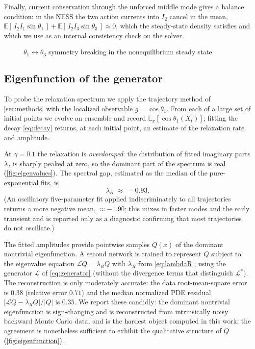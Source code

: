 \documentclass[11pt,a4paper]{article}
\theoremstyle{definition}
\newcommand{\E}{\mathbb{E}}
\numberwithin{equation}{section}   %
\newcommand{\Lgen}{\mathcal{L}}
\newcommand{\Ladj}{\mathcal{L}^{*}}
\begin{document}
Finally, current conservation through the unforced middle mode gives a balance
condition: in the NESS the two action currents into $I_2$ cancel in the mean,
$\E[\,I_2 I_1\sin\theta_1\,]+\E[\,I_2 I_3\sin\theta_3\,]\approx 0$, which the
steady-state density satisfies and which we use as an internal consistency check
on the solver.

\begin{figure}[ht]
  \centering
  \caption{$\theta_1\leftrightarrow\theta_3$ symmetry breaking in the
  nonequilibrium steady state.}
  \label{fig:symmetry}
\end{figure}

\subsection{Eigenfunction of the generator}\label{sec:eigenfunction}

To probe the relaxation spectrum we apply the trajectory method of
\cref{sec:methods} with the localized observable $g=\cos\theta_1$. From each of
a large set of initial points we evolve an ensemble and record
$\E_x[\cos\theta_1(X_t)]$; fitting the decay \eqref{eq:decay} returns, at each
initial point, an estimate of the relaxation rate and amplitude.

At $\gamma=0.1$ the relaxation is \emph{overdamped}: the distribution of fitted
imaginary parts $\lambda_I$ is sharply peaked at zero, so the dominant part of
the spectrum is real (\cref{fig:eigenvalues}). The spectral gap, estimated as
the median of the pure-exponential fits, is
\begin{equation}\label{eq:lambdaR}
  \lambda_R \;\approx\; -0.93 .
\end{equation}
(An oscillatory five-parameter fit applied indiscriminately to all trajectories
returns a more negative mean, $\approx-1.90$; this mixes in faster modes and the
early transient and is reported only as a diagnostic confirming that most
trajectories do not oscillate.)

The fitted amplitudes provide pointwise samples $Q(x)$ of the dominant
nontrivial eigenfunction. A second network is trained to represent $Q$ subject
to the eigenvalue equation $\Lgen Q=\lambda_R Q$ with $\lambda_R$ from
\eqref{eq:lambdaR}, using the generator $\Lgen$ of \eqref{eq:generator} (without
the divergence terms that distinguish $\Ladj$). The reconstruction is only
moderately accurate: the data root-mean-square error is $0.38$ (relative error
$0.71$) and the median normalized PDE residual $|\Lgen Q-\lambda_R Q|/|Q|$ is
$0.35$. We report these candidly: the dominant nontrivial eigenfunction is
sign-changing and is reconstructed from intrinsically noisy backward Monte
Carlo data, and is the hardest object computed in this work; the agreement is
nonetheless sufficient to exhibit the qualitative structure of $Q$
(\cref{fig:eigenfunction}).
\end{document}
